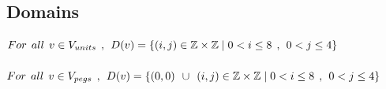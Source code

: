 \subsection{Domains}
$For \hspace{1ex} all \hspace{1ex} v \in V_{units} \hspace{1ex},\hspace{1ex} D(v)=\{(i,j) \in \mathbb{Z} \times \mathbb{Z}	\mid  0<i \leq 8 \hspace{1ex} , \hspace{1ex} 0<j \leq 4\}$\\
\\
$For \hspace{1ex} all \hspace{1ex} v \in V_{pegs} \hspace{1ex},\hspace{1ex} D(v)=\{(0,0) \hspace{1ex} \cup \hspace{1ex}(i,j) \in \mathbb{Z} \times \mathbb{Z}\mid  0<i \leq 8 \hspace{1ex} , \hspace{1ex} 0<j \leq 4\}$
